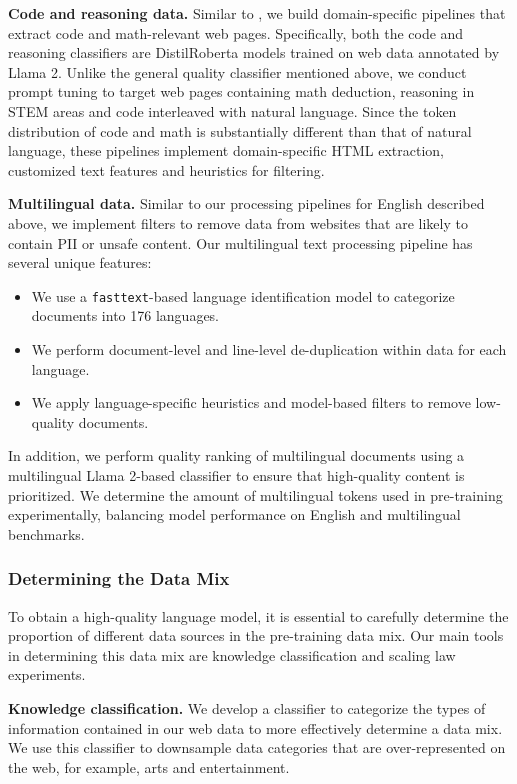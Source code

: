 \textbf{Code and reasoning data.}
Similar to \citet{deepseekai2024deepseekcoderv2breakingbarrierclosedsource}, we build domain-specific pipelines that extract code and math-relevant web pages. 
Specifically, both the code and reasoning classifiers are DistilRoberta models trained on web data annotated by Llama 2. 
Unlike the general quality classifier mentioned above, we conduct prompt tuning to target web pages containing math deduction, reasoning in STEM areas and code interleaved with natural language. 
Since the token distribution of code and math is substantially different than that of natural language, these pipelines implement domain-specific HTML extraction, customized text features and heuristics for filtering.

\textbf{Multilingual data.}
Similar to our processing pipelines for English described above, we implement filters to remove data from websites that are likely to contain PII or unsafe content.  %
Our multilingual text processing pipeline has several unique features:
\begin{itemize}
\item We use a \texttt{fasttext}-based language identification model to categorize documents into 176 languages.
\item We perform document-level and line-level de-duplication within data for each language.
\item We apply language-specific heuristics and model-based filters to remove low-quality documents.
\end{itemize}

In addition, we perform quality ranking of multilingual documents using a multilingual Llama 2-based classifier to ensure that high-quality content is prioritized.
We determine the amount of multilingual tokens used in pre-training experimentally, balancing model performance on  English and multilingual benchmarks.

\subsubsection{Determining the Data Mix}
To obtain a high-quality language model, it is essential to carefully determine the proportion of different data sources in the pre-training data mix. 
Our main tools in determining this data mix are knowledge classification and scaling law experiments.

\textbf{Knowledge classification.}
We develop a classifier to categorize the types of information contained in our web data to more effectively determine a data mix.
We use this classifier to downsample data categories that are over-represented on the web, for example, arts and entertainment.

